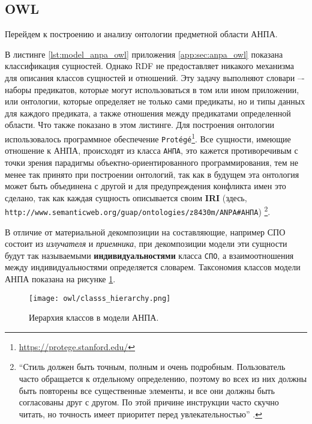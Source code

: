 \subsection{OWL}
Перейдем к построению и анализу онтологии предметной области АНПА.

В листинге \ref{lst:model_anpa_owl} приложения \ref{app:sec:anpa_owl} показана
классификация сущностей.
Однако RDF не предоставляет никакого механизма для описания классов сущностей и
отношений. Эту задачу выполняют словари –- наборы предикатов, которые могут
использоваться в том или ином приложении, или онтологии, которые определяет не только
сами предикаты, но и типы данных для каждого предиката, а также отношения между
предикатами определенной области.
Что также показано в этом листинге.
Для построения онтологии использовалось программное обеспечение
\texttt{Protégé}\footnote{\url{https://protege.stanford.edu/}}.
Все сущности, имеющие отношение к АНПА, происходят из класса \texttt{АНПА}, это кажется противоречивым с точки зрения
парадигмы объектно-ориентированного программирования,
тем не менее так принято при построении онтологий, так как в будущем эта онтология может быть объединена с другой
и для предупреждения конфликта имен это сделано, так как каждая сущность описывается своим \textbf{IRI}
(здесь, \texttt{http://www.semanticweb.org/guap/ontologies/z8430m/ANPA\#АНПА}) \cite[раздел 2.1]{journal:vestnik_vgtu:shapkin}\footnote{%
``Стиль должен быть точным, полным и очень подробным. Пользователь часто обращается к отдельному определению,
    поэтому во всех из них должны быть повторены все существенные элементы, и все они должны быть согласованы друг с другом.
    По этой причине инструкции часто скучно читать, но точность имеет приоритет перед увлекательностью'' \cite[гл.~6]{book:bruks:myth_mount_man}.
}.

В отличие от материальной декомпозиции на составляющие, например СПО состоит из \textit{излучателя} и \textit{приемника},
при декомпозиции модели эти сущности будут так называемыми \textbf{индивидуальностями} класса \texttt{СПО},
а взаимоотношения между индивидуальностями определяется словарем.
Таксономия классов модели АНПА показана на рисунке \ref{fig:owl_classs_hierarchy}.
\begin{center}
    \begin{figure}[ht!]
        \texttt{[image: owl/classs\_hierarchy.png]}
        \caption{Иерархия классов в модели АНПА.}\label{fig:owl_classs_hierarchy}
    \end{figure}
\end{center}

